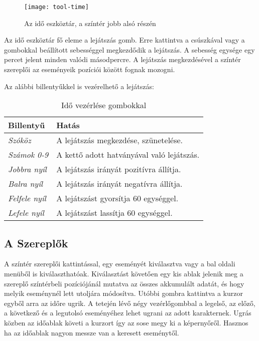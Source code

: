 \begin{figure}[h!]
	\centering
	\texttt{[image: tool-time]}
	\caption{Az idő eszköztár, a színtér jobb alsó részén}
	\label{fig:tool-time}
\end{figure}

Az idő eszköztár fő eleme a lejátszás gomb. Erre kattintva a csúszkával vagy a gombokkal beállított sebességgel megkezdődik a lejátszás. A sebesség egysége egy percet jelent minden valódi másodpercre. A lejátszás megkezdésével a színtér szereplői az eseményeik pozíciói között fognak mozogni.

Az alábbi billentyűkkel is vezérelhető a lejátszás:

\begin{table}[H]
	\centering
	\begin{tabular}{ | m{} | m{} | }
		\hline
		\textbf{Billentyű} & \textbf{Hatás}\\
		\hline \hline
		\emph{Szóköz} & A lejátszás megkezdése, szünetelése. \\
		\hline
		\emph{Számok 0-9} & A kettő adott hatványával való lejátszás. \\
		\hline
		\emph{Jobbra nyíl} & A lejátszás irányát pozitívra állítja.  \\
		\hline
		\emph{Balra nyíl} & A lejátszás irányát negatívra állítja.  \\
		\hline
		\emph{Felfele nyíl} & A lejátszást gyorsítja 60 egységgel. \\
		\hline
		\emph{Lefele nyíl} & A lejátszást lassítja 60 egységgel.  \\
		\hline
	\end{tabular}
	\caption{Idő vezérlése gombokkal}
	\label{tab:tool-time-control-keys}
\end{table}

\subsection{A Szereplők} \label{section:ui-actors}

A színtér szereplői kattintással, egy eseményét kiválasztva vagy a bal oldali menüből is kiválaszthatóak. Kiválasztást követően egy kis ablak jelenik meg a szereplő színtérbeli pozíciójánál mutatva az összes akkumulált adatát, és hogy melyik eseménynél lett utoljára módosítva. Utóbbi gombra kattintva a kurzor egyből arra az időre ugrik. A tetején lévő négy vezérlőgombbal a legelső, az előző, a következő és a legutolsó eseményéhez lehet ugrani az adott karakternek. Ugrás közben az időablak követi a kurzort így az sose megy ki a képernyőről. Hasznos ha az időablak nagyon messze van a keresett eseménytől.

